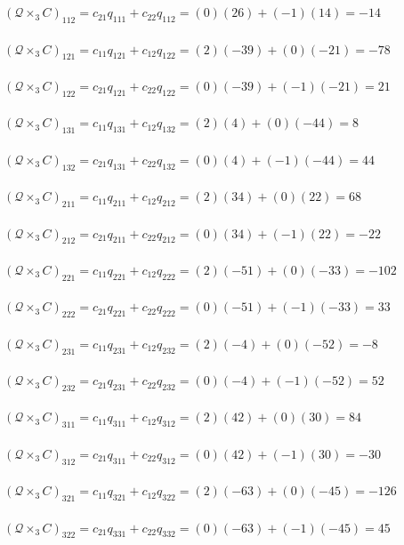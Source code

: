 \documentclass[12pt]{article}
\begin{document}
\\~\\$\left(\mathcal{Q}\times_3 C\right)_{112}=c_{21}q_{111}+c_{22}q_{112}=(0)(26)+(-1)(14)=-14$
\\~\\$\left(\mathcal{Q}\times_3 C\right)_{121}=c_{11}q_{121}+c_{12}q_{122}=(2)(-39)+(0)(-21)=-78$
\\~\\$\left(\mathcal{Q}\times_3 C\right)_{122}=c_{21}q_{121}+c_{22}q_{122}=(0)(-39)+(-1)(-21)=21$
\\~\\$\left(\mathcal{Q}\times_3 C\right)_{131}=c_{11}q_{131}+c_{12}q_{132}=(2)(4)+(0)(-44)=8$
\\~\\$\left(\mathcal{Q}\times_3 C\right)_{132}=c_{21}q_{131}+c_{22}q_{132}=(0)(4)+(-1)(-44)=44$
\\~\\$\left(\mathcal{Q}\times_3 C\right)_{211}=c_{11}q_{211}+c_{12}q_{212}=(2)(34)+(0)(22)=68$
\\~\\$\left(\mathcal{Q}\times_3 C\right)_{212}=c_{21}q_{211}+c_{22}q_{212}=(0)(34)+(-1)(22)=-22$
\\~\\$\left(\mathcal{Q}\times_3 C\right)_{221}=c_{11}q_{221}+c_{12}q_{222}=(2)(-51)+(0)(-33)=-102$
\\~\\$\left(\mathcal{Q}\times_3 C\right)_{222}=c_{21}q_{221}+c_{22}q_{222}=(0)(-51)+(-1)(-33)=33$
\\~\\$\left(\mathcal{Q}\times_3 C\right)_{231}=c_{11}q_{231}+c_{12}q_{232}=(2)(-4)+(0)(-52)=-8$
\\~\\$\left(\mathcal{Q}\times_3 C\right)_{232}=c_{21}q_{231}+c_{22}q_{232}=(0)(-4)+(-1)(-52)=52$
\\~\\$\left(\mathcal{Q}\times_3 C\right)_{311}=c_{11}q_{311}+c_{12}q_{312}=(2)(42)+(0)(30)=84$
\\~\\$\left(\mathcal{Q}\times_3 C\right)_{312}=c_{21}q_{311}+c_{22}q_{312}=(0)(42)+(-1)(30)=-30$
\\~\\$\left(\mathcal{Q}\times_3 C\right)_{321}=c_{11}q_{321}+c_{12}q_{322}=(2)(-63)+(0)(-45)=-126$
\\~\\$\left(\mathcal{Q}\times_3 C\right)_{322}=c_{21}q_{331}+c_{22}q_{332}=(0)(-63)+(-1)(-45)=45$
\end{document}

